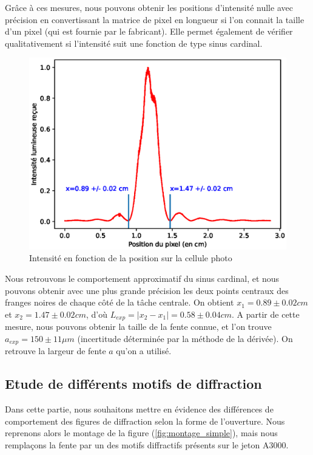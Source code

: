 \documentclass[12pt]{article}
\begin{document}
Grâce à ces mesures, nous pouvons obtenir les positions d'intensité nulle avec précision en convertissant la matrice de pixel en longueur si l'on connait la taille d'un pixel (qui est fournie par le fabricant).
Elle permet également de vérifier qualitativement si l'intensité suit une fonction de type sinus cardinal.
\begin{figure}[!h]
    \begin{center}
        \includegraphics[scale=0.5]{img/graphe_camera_lineaire.eps}
    \end{center}
    \caption{Intensité en fonction de la position sur la cellule photo}
\end{figure}

Nous retrouvons le comportement approximatif du sinus cardinal, et nous pouvons obtenir avec une plus grande précision les deux points centraux des franges noires de chaque côté de la tâche centrale.
On obtient $x_1 = 0.89 \pm 0.02 cm$ et $x_2 = 1.47\pm 0.02 cm$, d'où $L_{exp} = \left\lvert x_2 - x_1 \right\rvert = 0.58 \pm 0.04 cm$. A partir de cette mesure, nous pouvons obtenir la taille de la fente connue, et l'on trouve
$a_{exp} = 150 \pm 11 \mu m$ (incertitude déterminée par la méthode de la dérivée). On retrouve la largeur de fente $a$ qu'on a utilisé.

\break
\subsection{Etude de différents motifs de diffraction}
Dans cette partie, nous souhaitons mettre en évidence des différences de comportement des figures de diffraction selon la forme de l'ouverture. 
Nous reprenons alors le montage de la figure (\ref{fig:montage_simple}), mais nous remplaçons la fente par un des motifs diffractifs présents sur le jeton A3000. 
\end{document}
